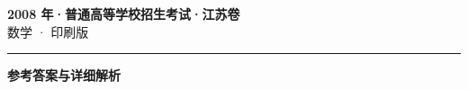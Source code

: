 \documentclass[zihao=5, a4paper]{ctexart}
\begin{document}
\begin{center}
  {\Large\bfseries 2008 年·普通高等学校招生考试·江苏卷}\\[4pt]
  {\large 数学 · 印刷版}
\end{center}
\medskip
{}

\par\bigskip\hrule\bigskip
{}
\begin{center}{\large\bfseries 参考答案与详细解析}\end{center}
\smallskip

\end{document}
